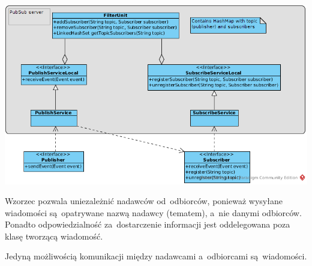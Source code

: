 \documentclass[11pt]{aghdpl}
\begin{document}
\begin{center}
 \includegraphics[width=14cm]{pubsub}
\end{center}

Wzorzec pozwala uniezależnić nadawców od~odbiorców, ponieważ wysyłane wiadomości są~opatrywane nazwą nadawcy (tematem), a~nie danymi odbiorców. Ponadto odpowiedzialność za~dostarczenie informacji jest oddelegowana poza klasę tworzącą wiadomość. 

Jedyną możliwością komunikacji między nadawcami a~odbiorcami są~wiadomości.
\end{document}
